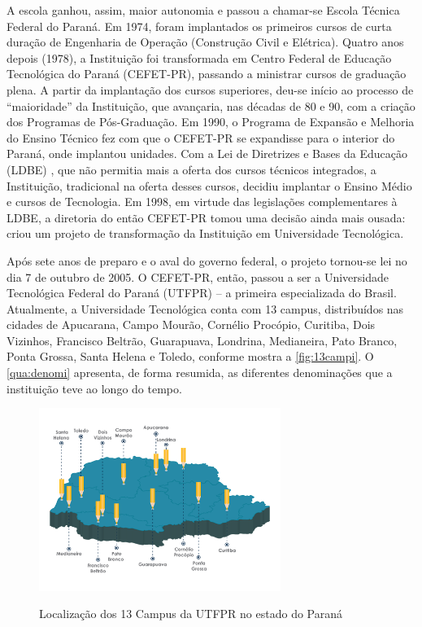 A escola ganhou, assim, maior autonomia e passou a chamar-se Escola Técnica Federal do Paraná. Em 1974, foram implantados os primeiros cursos de curta duração de Engenharia de Operação (Construção Civil e Elétrica). Quatro anos depois (1978), a Instituição foi transformada em Centro Federal de Educação Tecnológica do Paraná (CEFET-PR), passando a ministrar cursos de graduação plena. A partir da implantação dos cursos superiores, deu-se início ao processo de “maioridade” da Instituição, que avançaria, nas décadas de 80 e 90, com a criação dos Programas de Pós-Graduação. Em 1990, o Programa de Expansão e Melhoria do Ensino Técnico fez com que o CEFET-PR se expandisse para o interior do Paraná, onde implantou unidades. Com a Lei de Diretrizes e Bases da Educação (LDBE) \cite{Lei:9394:1996}, que não permitia mais a oferta dos cursos técnicos integrados, a Instituição, tradicional na oferta desses cursos, decidiu implantar o Ensino Médio e cursos de Tecnologia. Em 1998, em virtude das legislações complementares à LDBE, a diretoria do então CEFET-PR tomou uma decisão ainda mais ousada: criou um projeto de transformação da Instituição em Universidade Tecnológica.


Após sete anos de preparo e o aval do governo federal, o projeto tornou-se lei no dia 7 de outubro de 2005. O CEFET-PR, então, passou a ser a Universidade Tecnológica Federal do Paraná (UTFPR) \cite{Lei:11.184:2005} – a primeira especializada do Brasil. Atualmente, a Universidade Tecnológica conta com 13 campus, distribuídos nas cidades de Apucarana, Campo Mourão, Cornélio Procópio, Curitiba, Dois Vizinhos, Francisco Beltrão, Guarapuava, Londrina,  Medianeira, Pato Branco, Ponta Grossa, Santa Helena e Toledo, conforme mostra a \autoref{fig:13campi}. O \autoref{qua:denomi} apresenta, de forma resumida, as diferentes denominações que a instituição teve ao longo do tempo.


    \begin{figure}[!htb]
        \centering
        \caption[Localização dos 13 Campus da UTFPR]{Localização dos 13 Campus da UTFPR no estado do Paraná}
        \includegraphics[width=0.7\textwidth]{Caps/Figs/campus_utfpr.png}
        \fonte{\utf}
        \label{fig:13campi}
    \end{figure}
    
